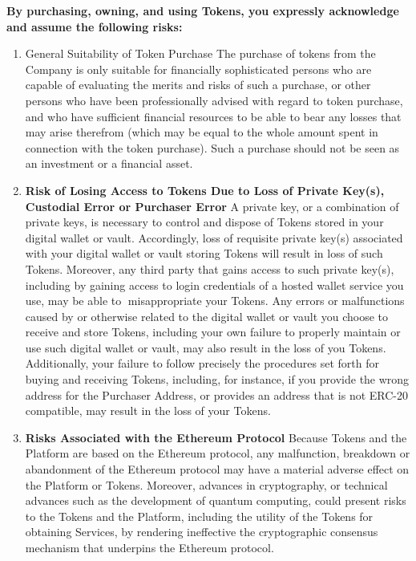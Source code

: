 \textbf{By purchasing, owning, and using Tokens, you expressly acknowledge and assume the following risks:}
 \begin{enumerate}
    \item General Suitability of Token Purchase
    The purchase of tokens from the Company is only suitable for financially sophisticated persons who are capable of evaluating the merits and risks of such a purchase, or other persons who have been professionally advised with regard to token purchase, and who have sufficient financial resources to be able to bear any losses that may arise therefrom (which may be equal to the whole amount spent in connection with the token purchase). Such a purchase should not be seen as an investment or a financial asset.

    \item \textbf{Risk of Losing Access to Tokens Due to Loss of Private Key(s), Custodial Error or Purchaser Error}
    A private key, or a combination of private keys, is necessary to control and dispose of Tokens stored in your digital wallet or vault. Accordingly, loss of requisite private key(s) associated with your digital wallet or vault storing Tokens will result in loss of such Tokens. Moreover, any third party that gains access to such private key(s), including by gaining access to login credentials of a hosted wallet service you use, may be able to misappropriate your Tokens. Any errors or malfunctions caused by or otherwise related to the digital wallet or vault you choose to receive and store Tokens, including your own failure to properly maintain or use such digital wallet or vault, may also result in the loss of you Tokens. Additionally, your failure to follow precisely the procedures set forth for buying and receiving Tokens, including, for instance, if you provide the wrong address for the Purchaser Address, or provides an address that is not ERC-20 compatible, may result in the loss of your Tokens.
    
    \item \textbf{Risks Associated with the Ethereum Protocol}
    Because Tokens and the Platform are based on the Ethereum protocol, any malfunction, breakdown or abandonment of the Ethereum protocol may have a material adverse effect on the Platform or Tokens. Moreover, advances in cryptography, or technical advances such as the development of quantum computing, could present risks to the Tokens and the Platform, including the utility of the Tokens for obtaining Services, by rendering ineffective the cryptographic consensus mechanism that underpins the Ethereum protocol.


\end{enumerate}
